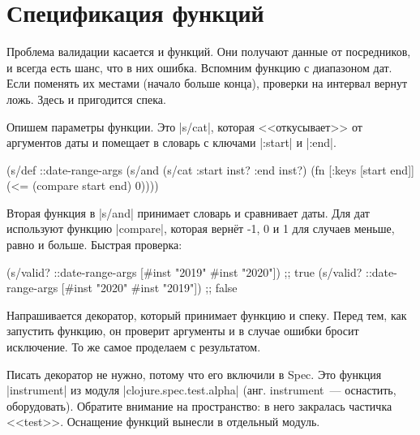 \section{Спецификация функций}


Проблема валидации касается и функций. Они получают данные от посредников, и
всегда есть шанс, что в них ошибка. Вспомним функцию с диапазоном дат. Если
поменять их местами (начало больше конца), проверки на интервал вернут
ложь. Здесь и пригодится спека.

Опишем параметры функции. Это \spverb|s/cat|, которая <<откусывает>> от
аргументов даты и помещает в словарь с ключами \spverb|:start| и \spverb|:end|.

\begin{english}
  \begin{clojure}
(s/def ::date-range-args
  (s/and
   (s/cat :start inst? :end inst?)
   (fn [{:keys [start end]}]
     (<= (compare start end) 0))))
  \end{clojure}
\end{english}


Вторая функция в \spverb|s/and| принимает словарь и сравнивает даты. Для дат
используют функцию \spverb|compare|, которая верн\"{е}т -1, 0 и 1 для случаев
меньше, равно и больше. Быстрая проверка:

\begin{english}
  \begin{clojure}
(s/valid? ::date-range-args [#inst "2019" #inst "2020"]) ;; true
(s/valid? ::date-range-args [#inst "2020" #inst "2019"]) ;; false
  \end{clojure}
\end{english}


Напрашивается декоратор, который принимает функцию и спеку. Перед тем, как
запустить функцию, он проверит аргументы и в случае ошибки бросит исключение. То
же самое проделаем с результатом.


Писать декоратор не нужно, потому что его включили в Spec. Это функция
\spverb|instrument| из модуля \spverb|clojure.spec.test.alpha|
(анг. instrument~--- оснастить, оборудовать). Обратите внимание на пространство:
в него закралась частичка <<test>>. Оснащение функций вынесли в отдельный
модуль.

